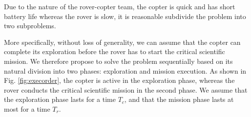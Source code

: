 \documentclass[conference]{IEEEtran}
\begin{document}
  Due to the nature of the rover-copter team, the copter is quick and has short battery life whereas the rover is slow,  it is reasonable subdivide the problem into two subproblems.
  
  More specifically, without loss of generality, we can  assume that the copter can complete its exploration  before the rover has to start the critical scientific mission. 
 We therefore propose to solve the problem sequentially based on its natural division into two phases: exploration and mission execution.  As shown in Fig. \ref{fig:execorder}, the copter is active in the exploration phase, whereas the rover conducts the critical scientific mission in the second phase. We assume that the exploration phase lasts for a time $T_c$, and that the mission phase lasts at most for a time $T_r$. 
%
%
%
%
%
%
%
%
%
\end{document}
